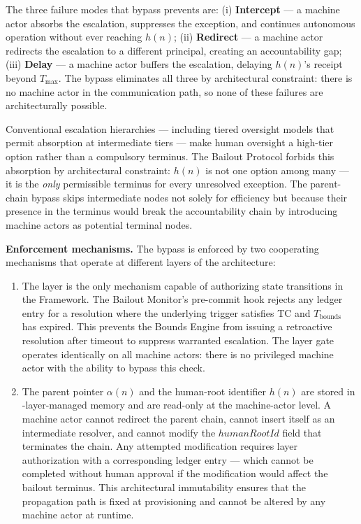 The three failure modes that bypass prevents are: (i) \textbf{Intercept} — a machine actor absorbs the escalation, suppresses the exception, and continues autonomous operation without ever reaching $h(n)$; (ii) \textbf{Redirect} — a machine actor redirects the escalation to a different principal, creating an accountability gap; (iii) \textbf{Delay} — a machine actor buffers the escalation, delaying $h(n)$'s receipt beyond $T_{\max}$. The bypass eliminates all three by architectural constraint: there is no machine actor in the communication path, so none of these failures are architecturally possible.

Conventional escalation hierarchies — including tiered oversight models that permit absorption at intermediate tiers — make human oversight a high-tier option rather than a compulsory terminus. The Bailout Protocol forbids this absorption by architectural constraint: $h(n)$ is not one option among many — it is the \emph{only} permissible terminus for every unresolved exception. The parent-chain bypass skips intermediate nodes not solely for efficiency but because their presence in the terminus would break the accountability chain by introducing machine actors as potential terminal nodes.

\medskip\noindent\textbf{Enforcement mechanisms.} The bypass is enforced by two cooperating mechanisms that operate at different layers of the \bxthree{} architecture:

\begin{enumerate}
\item[(\textbf{Fact Layer gate})] The \fact{} layer is the only mechanism capable of authorizing state transitions in the \bxthree{} Framework. The Bailout Monitor's pre-commit hook rejects any ledger entry for a resolution where the underlying trigger satisfies TC and $T_{\text{bounds}}$ has expired. This prevents the Bounds Engine from issuing a retroactive resolution after timeout to suppress warranted escalation. The \fact{} layer gate operates identically on all machine actors: there is no privileged machine actor with the ability to bypass this check.

\item[(\textbf{Immutable parent-pointer and human-root architecture})] The parent pointer $\alpha(n)$ and the human-root identifier $h(n)$ are stored in \fact-layer-managed memory and are read-only at the machine-actor level. A machine actor cannot redirect the parent chain, cannot insert itself as an intermediate resolver, and cannot modify the $humanRootId$ field that terminates the chain. Any attempted modification requires \purpose{} layer authorization with a corresponding ledger entry — which cannot be completed without human approval if the modification would affect the bailout terminus. This architectural immutability ensures that the propagation path is fixed at provisioning and cannot be altered by any machine actor at runtime.
\end{enumerate}

